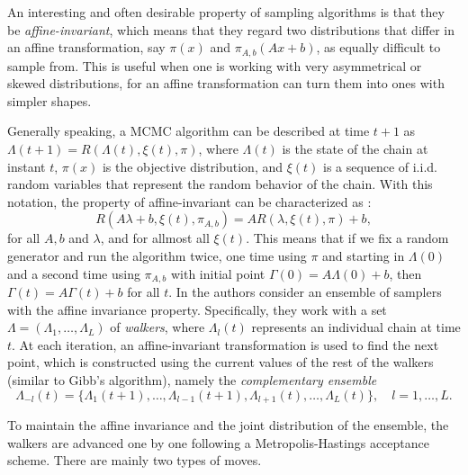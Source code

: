 An interesting and often desirable property of sampling algorithms is that they be \textit{affine-invariant}, which means that they regard two distributions that differ in an affine transformation, say \(\pi(x)\) and \(\pi_{A, b}(Ax + b)\), as equally difficult to sample from. This is useful when one is working with very asymmetrical or skewed distributions, for an affine transformation can turn them into ones with simpler shapes.

Generally speaking, a MCMC algorithm can be described at time \(t+1\) as \(\Lambda(t+1)=R(\Lambda(t), \xi(t), \pi)\), where \(\Lambda(t)\) is the state of the chain at instant \(t\), \(\pi(x)\) is the objective distribution, and \(\xi(t)\) is a sequence of i.i.d. random variables that represent the random behavior of the chain. With this notation, the property of affine-invariant can be characterized as \citep{goodman2010ensemble}:
 \[
 R(A\lambda+b, \xi(t), \pi_{A,b}) = AR(\lambda, \xi(t), \pi) + b,
 \]
 for all \(A,b\) and \(\lambda\), and for allmost all \(\xi(t)\). This means that if we fix a random generator and run the algorithm twice, one time using \(\pi\) and starting in \(\Lambda(0)\) and a second time using \(\pi_{A,b}\) with initial point \(\Gamma(0)=A\Lambda(0)+b\), then \(\Gamma(t)=A\Gamma(t)+b\) for all \(t\). In \citep{goodman2010ensemble} the authors consider an ensemble of samplers with the affine invariance property. Specifically, they work with a set \(\Lambda=(\Lambda_1, \dots, \Lambda_L)\) of \textit{walkers}, where \(\Lambda_l(t)\) represents an individual chain at time \(t\). At each iteration, an affine-invariant transformation is used to find the next point, which is constructed using the current values of the rest of the walkers (similar to Gibb's algorithm), namely the \textit{complementary ensemble}
 \[
  \Lambda_{-l}(t) = \{\Lambda_1(t+1), \dots, \Lambda_{l-1}(t+1), \Lambda_{l+1}(t), \dots, \Lambda_L(t)\}, \quad l=1,\dots, L.
  \]

To maintain the affine invariance and the joint distribution of the ensemble, the walkers are advanced one by one following a Metropolis-Hastings acceptance scheme. There are mainly two types of moves.

